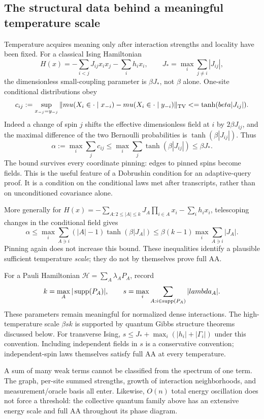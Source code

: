 \subsection{The structural data behind a meaningful temperature scale}
\label{threshold_physics:scales}

Temperature acquires meaning only after interaction strengths and
locality have been fixed. For a classical Ising Hamiltonian
\[
 H(x)=-\sum_{i<j}J_{ij}x_ix_j-\sum_i h_ix_i,
 \qquad J_* =\max_i\sum_{j\ne i}|J_{ij}|,
\]
the dimensionless small-coupling parameter is \(\beta J_*\), not
\(\beta\) alone. One-site conditional distributions obey
\[
 c_{ij}:=\sup_{x_{-j}=y_{-j}}
 \|\mu(X_i\in\cdot\mid x_{-i})-
       \mu(X_i\in\cdot\mid y_{-i})\|_{\rm TV}
 \le\tanh(\beta|J_{ij}|).
\]
Indeed a change of spin \(j\) shifts the effective dimensionless field
at \(i\) by \(2\beta J_{ij}\), and the maximal difference of the two
Bernoulli probabilities is \(\tanh(\beta|J_{ij}|)\). Thus
\[
 \alpha:=\max_i\sum_j c_{ij}
 \le\max_i\sum_j\tanh(\beta|J_{ij}|)\le\beta J_*.
\]
The bound survives every coordinate pinning: edges to pinned spins
become fields. This is the useful feature of a Dobrushin condition for
an adaptive-query proof. It is a condition on the conditional laws met
after transcripts, rather than on unconditioned covariance alone.

More generally for
\(H(x)=-\sum_{A:2\le|A|\le k}J_A\prod_{i\in A}x_i
-\sum_i h_ix_i\), telescoping changes in the conditional field gives
\[
 \alpha\le
 \max_i\sum_{A\ni i}(|A|-1)\tanh(\beta|J_A|)
 \le \beta(k-1)\max_i\sum_{A\ni i}|J_A|.
\]
Pinning again does not increase this bound. These inequalities identify
a plausible sufficient temperature \emph{scale}; they do not by
themselves prove full AA.

For a Pauli Hamiltonian \(\mathcal H=\sum_A\lambda_AP_A\), record
\[
 k=\max_A|\supp(P_A)|,
 \qquad s=\max_i\sum_{A:i\in\supp(P_A)}|\lambda_A|.
\]
These parameters remain meaningful for normalized dense interactions.
The high-temperature scale \(\beta sk\) is supported by quantum Gibbs
structure theorems discussed below. For transverse Ising,
\(s\le J_*+\max_i(|h_i|+|\Gamma_i|)\) under this convention.
Including independent fields in \(s\) is a conservative convention;
independent-spin laws themselves satisfy full AA at every temperature.

A sum of many weak terms cannot be classified from the spectrum of one
term. The graph, per-site summed strengths, growth of interaction
neighborhoods, and measurement/oracle basis all enter. Likewise,
\(O(n)\) total energy oscillation does not force a threshold: the
collective quantum family above has an extensive energy scale and full
AA throughout its phase diagram.
